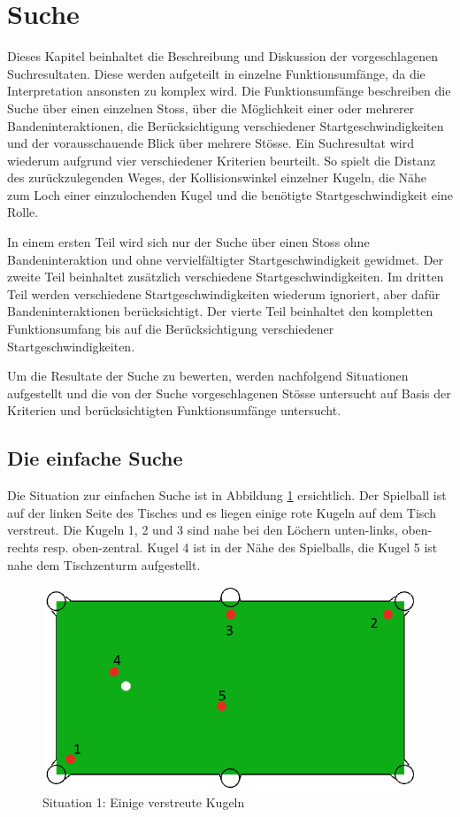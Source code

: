 \section{Suche}
Dieses Kapitel beinhaltet die Beschreibung und Diskussion der vorgeschlagenen Suchresultaten. Diese werden aufgeteilt
in einzelne Funktionsumfänge, da die Interpretation ansonsten zu komplex wird. Die Funktionsumfänge beschreiben die Suche
über einen einzelnen Stoss, über die Möglichkeit einer oder mehrerer Bandeninteraktionen, die Berücksichtigung verschiedener
Startgeschwindigkeiten und der vorausschauende Blick über mehrere Stösse.
Ein Suchresultat wird wiederum aufgrund vier verschiedener
Kriterien beurteilt. So spielt die Distanz des zurückzulegenden Weges, der Kollisionswinkel einzelner Kugeln, die Nähe
zum Loch einer einzulochenden Kugel und die benötigte Startgeschwindigkeit eine Rolle.

In einem ersten Teil wird sich nur der Suche über einen Stoss ohne Bandeninteraktion und ohne
vervielfältigter Startgeschwindigkeit gewidmet. Der zweite Teil beinhaltet zusätzlich verschiedene Startgeschwindigkeiten.
Im dritten Teil werden verschiedene Startgeschwindigkeiten wiederum ignoriert, aber dafür Bandeninteraktionen berücksichtigt.
Der vierte Teil beinhaltet den kompletten Funktionsumfang bis auf die Berücksichtigung verschiedener Startgeschwindigkeiten.

Um die Resultate der Suche zu bewerten, werden nachfolgend Situationen aufgestellt und die von der Suche
vorgeschlagenen Stösse untersucht auf Basis der Kriterien und berücksichtigten Funktionsumfänge untersucht.

\subsection{Die einfache Suche}\label{kap:suche:die_einfache_suche}
Die Situation zur einfachen Suche ist in Abbildung \ref{fig:search_situation_1} ersichtlich.
Der Spielball ist auf der linken Seite des Tisches und es liegen einige rote Kugeln auf dem Tisch verstreut.
Die Kugeln 1, 2 und 3 sind nahe bei den Löchern unten-links, oben-rechts resp. oben-zentral.
Kugel 4 ist in der Nähe des Spielballs, die Kugel 5 ist nahe dem Tischzenturm aufgestellt.

%
%
\begin{figure}[h!]
    \begin{center}
        \includegraphics[width=0.4\linewidth]{../common/04_results/resources/simple_search/situation_diverse.PNG}
    \end{center}
    \caption{Situation 1: Einige verstreute Kugeln}
    \label{fig:search_situation_1}
\end{figure}

